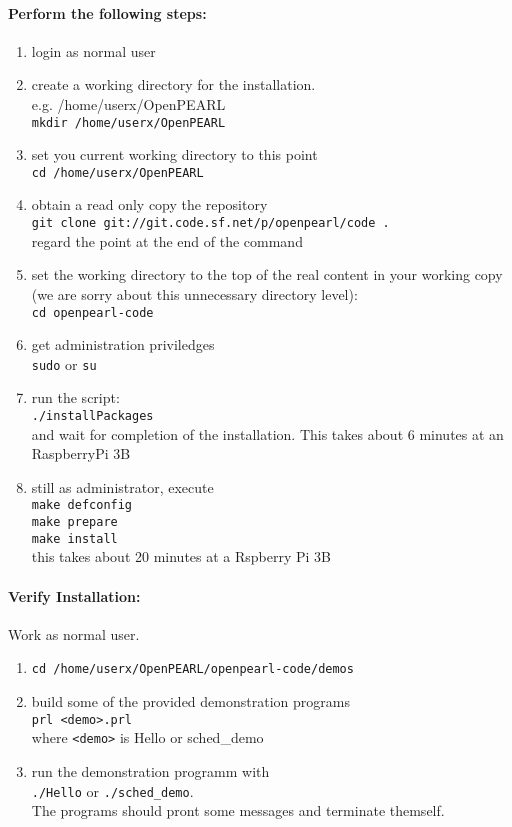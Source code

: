 \documentclass[10pt]{scrbook}
\begin{document}
\paragraph{Perform the following steps:}
\begin{enumerate}
\item login as normal user
\item create a working directory for the installation. \\
   e.g. /home/userx/OpenPEARL\\
    \verb|mkdir /home/userx/OpenPEARL|
\item set you current working directory to this point \\
    \verb|cd /home/userx/OpenPEARL|
\item obtain a read only copy the repository\\
    \verb|git clone git://git.code.sf.net/p/openpearl/code .|\\
    regard the point at the end of the command
\item set the working directory to the top of the real content
     in your working copy 
     (we are sorry about this unnecessary directory level): \\
    \verb|cd openpearl-code|
\item get administration priviledges\\
    \verb|sudo| or \verb|su|
\item run the script:\\
    \verb|./installPackages|\\
    and wait for completion of the installation.
    This takes about 6 minutes at an RaspberryPi 3B
\item still as administrator, execute\\
    \verb|make defconfig|\\
    \verb|make prepare|\\
    \verb|make install|\\
    this takes about 20 minutes at a Rspberry Pi 3B
\end{enumerate}

\paragraph{Verify Installation:}
Work as normal user.


\begin{enumerate}
\item \verb|cd /home/userx/OpenPEARL/openpearl-code/demos|
\item build some of the provided demonstration programs\\
   \verb|prl <demo>.prl|\\
   where \verb|<demo>| is Hello or sched\_demo
\item run the demonstration programm with \\
   \verb|./Hello| or \verb|./sched_demo|.\\
   The programs should pront some messages and terminate themself.
\end{enumerate}
\end{document}
